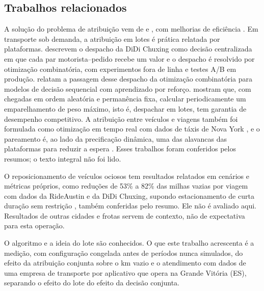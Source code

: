 \subsection{Trabalhos relacionados}

A solução do problema de atribuição vem de  e , com melhorias de eficiência \cite{tomizawa1971, edmondskarp1972, jonker1987, crouse2016}. Em transporte sob demanda, a atribuição em lotes é prática relatada por plataformas.  descrevem o despacho da DiDi Chuxing como decisão centralizada em que cada par motorista--pedido recebe um valor e o despacho é resolvido por otimização combinatória, com experimentos fora de linha e testes A/B em produção.  relatam a passagem desse despacho da otimização combinatória para modelos de decisão sequencial com aprendizado por reforço.  mostram que, com chegadas em ordem aleatória e permanência fixa, calcular periodicamente um emparelhamento de peso máximo, isto é, despachar em lotes, tem garantia de desempenho competitivo. A atribuição entre veículos e viagens também foi formulada como otimização em tempo real com dados de táxis de Nova York \cite{alonsomora2017}, e o pareamento é, ao lado da precificação dinâmica, uma das alavancas das plataformas para reduzir a espera \cite{yan2020}. Esses trabalhos foram conferidos pelos resumos; o texto integral não foi lido.

O reposicionamento de veículos ociosos tem resultados relatados em cenários e métricas próprios, como reduções de 53\% a 82\% das milhas vazias por viagem com dados da RideAustin e da DiDi Chuxing, supondo estacionamento de curta duração sem restrição \cite{kontou2020}, também conferidas pelo resumo. Ele não é avaliado aqui. Resultados de outras cidades e frotas servem de contexto, não de expectativa para esta operação.

O algoritmo e a ideia do lote são conhecidos. O que este trabalho acrescenta é a medição, com configuração congelada antes de períodos nunca simulados, do efeito da atribuição conjunta sobre o km vazio e o atendimento com dados de uma empresa de transporte por aplicativo que opera na Grande Vitória (ES), separando o efeito do lote do efeito da decisão conjunta.
